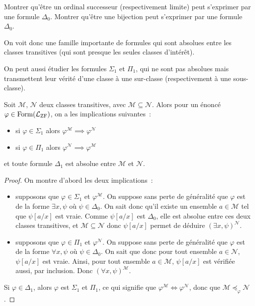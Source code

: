 \begin{exercise}
  Montrer qu'être un ordinal successeur (respectivement limite) peut s'exprimer
  par une formule $\Delta_0$. Montrer qu'être une bijection peut s'exprimer
  par une formule $\Delta_0$.
\end{exercise}

On voit donc une famille importante de formules qui sont absolues entre les
classes transitives (qui sont presque les seules classes d'intérêt).

On peut aussi étudier les formules $\Sigma_1$ et $\Pi_1$, qui ne sont pas
absolues mais transmettent leur vérité d'une classe à une sur-classe
(respectivement à une sous-classe).

\begin{proposition}
  Soit $\mathcal M$, $\mathcal N$ deux classes transitives, avec
  $\mathcal M \subseteq \mathcal N$. Alors pour un énoncé
  $\varphi\in\operatorname{Form}(\mathcal L_{\operatorname{ZF}})$, on a les implications suivantes~:
  \begin{itemize}
  \item si $\varphi \in \Sigma_1$ alors
    $\varphi^{\mathcal M} \implies \varphi^{\mathcal N}$
  \item si $\varphi \in \Pi_1$ alors
    $\varphi^{\mathcal N} \implies \varphi^{\mathcal M}$
  \end{itemize}
  et toute formule $\Delta_1$ est absolue entre $\mathcal M$ et $\mathcal N$.
\end{proposition}

\begin{proof}
  On montre d'abord les deux implications~:
  \begin{itemize}
  \item supposons que $\varphi \in \Sigma_1$ et $\varphi^{\mathcal M}$. On
    suppose sans perte de généralité que $\varphi$ est de la forme
    $\exists x, \psi$ où $\psi\in\Delta_0$. On sait donc qu'il existe un
    ensemble $a\in\mathcal M$ tel que $\psi[a/x]$ est vraie. Comme
    $\psi[a/x]$ est $\Delta_0$, elle est absolue entre ces deux classes
    transitives, et $\mathcal M \subseteq\mathcal N$ donc $\psi[a/x]$
    permet de déduire $(\exists x, \psi)^{\mathcal N}$.
  \item supposons que $\varphi \in \Pi_1$ et $\varphi^{\mathcal N}$. On
    suppose sans perte de généralité que $\varphi$ est de la forme
    $\forall x, \psi$ où $\psi\in\Delta_0$. On sait que donc pour tout
    ensemble $a\in \mathcal N$, $\psi[a/x]$ est vraie. Ainsi, pour tout
    ensemble $a\in \mathcal M$, $\psi[a/x]$ est vérifiée aussi, par inclusion.
    Donc $(\forall x, \psi)^{\mathcal M}$.
  \end{itemize}

  Si $\varphi\in\Delta_1$, alors $\varphi$ est $\Sigma_1$ et $\Pi_1$, ce qui
  signifie que $\varphi^{\mathcal M}\iff \varphi^{\mathcal N}$, donc que
  $\mathcal M\preccurlyeq_\varphi \mathcal N$.
\end{proof}

